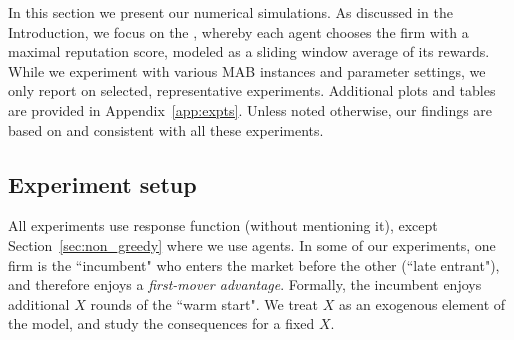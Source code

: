 \documentclass[../competing_bandits.tex]{subfiles}
\begin{document}
In this section we present our numerical simulations. As discussed in the Introduction, we focus on the \ExptsModel, whereby each agent chooses the firm with a maximal reputation score, modeled as a sliding window average of its rewards. While we experiment with various MAB instances and parameter settings, we only report on selected, representative experiments. Additional plots and tables are provided in Appendix~\ref{app:expts}. Unless noted otherwise, our findings are based on and consistent with all these experiments.


\subsection{Experiment setup}
\label{expts-prelims}



 All experiments use \HardMax response function (without mentioning it), except Section~\ref{sec:non_greedy} where we use \HardMaxRandom agents. In some of our experiments, one firm is the ``incumbent" who enters the market before the other (``late entrant"), and therefore enjoys a \emph{first-mover advantage}. Formally, the incumbent enjoys additional $X$ rounds of the ``warm start". We treat $X$ as an exogenous element of the model, and study the consequences for a fixed $X$.
\end{document}
